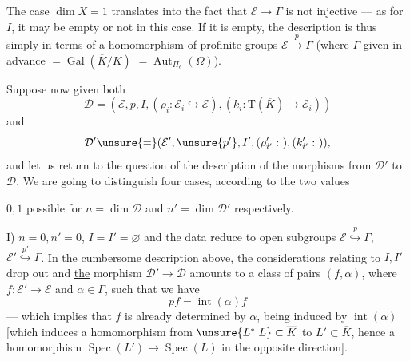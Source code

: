 The case $\dim X=1$ translates into the fact that $\mathcal E\longrightarrow\Gamma$ is not injective --- as for $I$, it may be empty or not in this case.
If it is empty, the description is thus simply in terms of a homomorphism of profinite groups $\mathcal E\xrightarrow{p}\Gamma$ (where $\Gamma$ given in advance $=\operatorname{Gal}(\overline K/K)$ \unsure{\}} $=\operatorname{Aut}_{\Pi_e}(\Omega)$).

Suppose now given both
\[
\mathcal D=(\mathcal E,p,I,(\rho_i:\mathcal E_i\hookrightarrow\mathcal E),(k_i:\mathrm T(\overline K)\longrightarrow\mathcal E_i))
\]
and
\[
\mathcal D'\unsure{=} (\mathcal E',\unsure{p'},I',(\rho'_{i'}:\ ),(k'_{i'}:\ )),
\]
and let us return to the question of the description of the morphisms from $\mathcal D'$ to $\mathcal D$.
We are going to distinguish four cases, according to the two values

$0,1$ possible for $n=\dim\mathcal D$ and $n'=\dim\mathcal D'$ respectively.

I) $n=0,n'=0$,  $I=I'=\varnothing$ and the data reduce to open subgroups
$\mathcal E\overset{p}{\hookrightarrow}\Gamma$, $\mathcal E'\overset{p'}{\hookrightarrow}\Gamma$.
In the cumbersome description above,  the considerations relating to $I,I'$ drop out and \uline{the} morphism $\mathcal D'\longrightarrow\mathcal D$ amounts to a class of  pairs $(f,\alpha)$, where
$f:\mathcal E'\longrightarrow\mathcal E$ and $\alpha\in\Gamma$, such that we have
\[
pf=\operatorname{int}(\alpha)f
\]
--- which implies that $f$ is already determined by $\alpha$, being induced by $\operatorname{int}(\alpha)$
\inserted{[$\alpha$ subject to $\alpha\in\operatorname{Trans}_{\Gamma}(\mathcal E',\mathcal E)$ \unsure{$=$} $\operatorname{Trans}_{\Gamma}(L,L')$]}
[which induces  a homomorphism from $\unsure{L^*|L}\subset\overline K$ to $L'\subset\overline K$, hence a homomorphism $\operatorname{Spec}(L')\longrightarrow\operatorname{Spec}(L)$ in the opposite direction].

